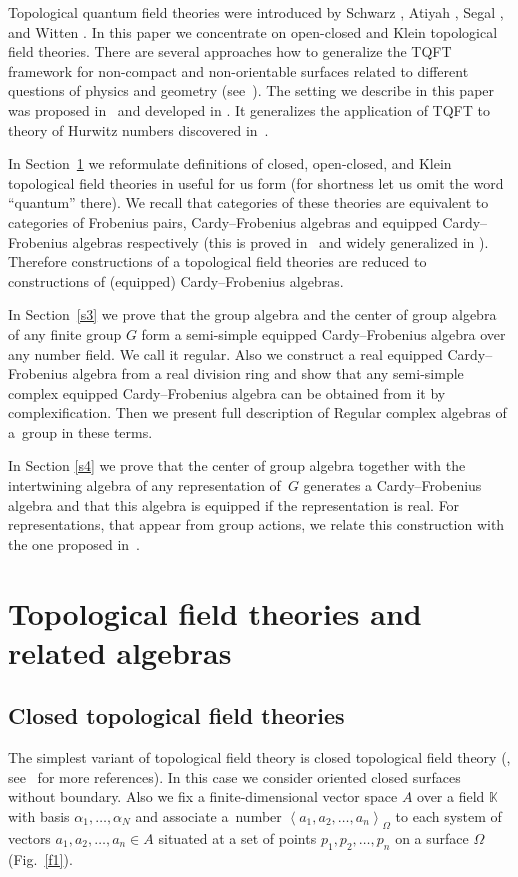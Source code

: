 \documentclass[pdftex]{sigma}
\def \lc {\left<}
\def \rc {\right>}
\begin{document}
Topological quantum f\/ield theories were introduced by
Schwarz \cite{Sch}, Atiyah \cite{At}, Segal \cite{Se},
and Witten \cite{W}. In this paper we concentrate on
open-closed and Klein topological f\/ield theories.
There are several approaches how to generalize the TQFT framework
for non-compact and non-orientable surfaces related to
dif\/ferent questions of physics and geometry
(see~\cite{Du, FFFS, FRS, LR,MS,N,TT}).
The setting we describe in this paper was proposed in~\cite{AN} and developed in
\cite{AN1,AN2,AN3}. It generalizes the application of TQFT to
theory of Hurwitz numbers discovered in~\cite{D1}.

In Section~\ref{s2} we reformulate def\/initions of closed, open-closed,
and Klein topological f\/ield theories in useful for us form
(for shortness let us omit the word ``quantum'' there).
We recall that categories of
these theories are equivalent to categories of Frobenius pairs,
Cardy--Frobenius algebras and equipped Cardy--Frobenius algebras
respectively (this is proved in~\cite{D2,AN} and widely generalized in  \cite{N1,N2}). Therefore constructions of
a topological f\/ield theories are reduced to constructions of
(equipped) Cardy--Frobenius algebras.

In Section~\ref{s3} we prove that the group algebra and the center of group
algebra of any f\/inite group $G$ form a semi-simple
equipped Cardy--Frobenius algebra over any number f\/ield. We call it regular.
Also we construct a real equipped Cardy--Frobenius algebra from a real division ring
and show that any semi-simple complex equipped Cardy--Frobenius algebra
can be obtained from it by complexif\/ication.
Then we present full description of Regular complex algebras of a~group in these terms.

In Section \ref{s4} we prove that the center of group algebra together with
the intertwining algebra of any representation of~$G$ generates a Cardy--Frobenius algebra
and that this algebra is
equipped if the representation is real.
For representations, that appear
from group actions, we relate this construction with the one proposed in~\cite{AN3}.




\section{Topological f\/ield theories and related algebras}\label{s2}

\subsection{Closed topological f\/ield theories} The simplest variant
of topological f\/ield theory is closed topological f\/ield theory
(\cite{At, D2}, see~\cite{K} for more references). In this case we consider oriented closed
surfaces without boundary. Also  we f\/ix a f\/inite-dimensional vector space
$A$ over a f\/ield $\mathbb{K}$ with basis $\alpha_1, \dots, \alpha_N$ and associate a~number
$\lc a_1,a_2,\dots ,a_n \rc_{\Omega}$ to each system of vectors
$a_1,a_2,\dots ,a_n\in A$ situated at a set of points
$p_1,p_2,\dots ,p_n$ on a surface $\Omega$ (Fig.~\ref{f1}).
\end{document}
